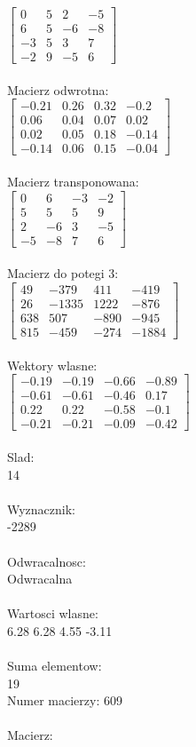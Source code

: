 \documentclass[a4paper,12pt]{article}
\begin{document}
$\begin{bmatrix} 0&5&2&-5\\6&5&-6&-8\\-3&5&3&7\\-2&9&-5&6 \end{bmatrix}$
\\
\\
Macierz odwrotna:\\

$\begin{bmatrix} -0.21&0.26&0.32&-0.2\\0.06&0.04&0.07&0.02\\0.02&0.05&0.18&-0.14\\-0.14&0.06&0.15&-0.04 \end{bmatrix}$
\\
\\
Macierz transponowana:\\

$\begin{bmatrix} 0&6&-3&-2\\5&5&5&9\\2&-6&3&-5\\-5&-8&7&6 \end{bmatrix}$
\\
\\
Macierz do potegi 3:\\

$\begin{bmatrix} 49&-379&411&-419\\26&-1335&1222&-876\\638&507&-890&-945\\815&-459&-274&-1884 \end{bmatrix}$
\\
\\
Wektory wlasne:\\

$\begin{bmatrix} -0.19&-0.19&-0.66&-0.89\\-0.61&-0.61&-0.46&0.17\\0.22&0.22&-0.58&-0.1\\-0.21&-0.21&-0.09&-0.42 \end{bmatrix}$
\\
\\
Slad:\\
14
\\
\\
Wyznacznik:\\
-2289
\\
\\
Odwracalnosc:\\
Odwracalna
\\
\\
Wartosci wlasne:\\
6.28 6.28 4.55 -3.11
\\
\\
Suma elementow:\\
19
\\
\newpage
Numer macierzy:
609
\\
\\
Macierz:\\
\end{document}

